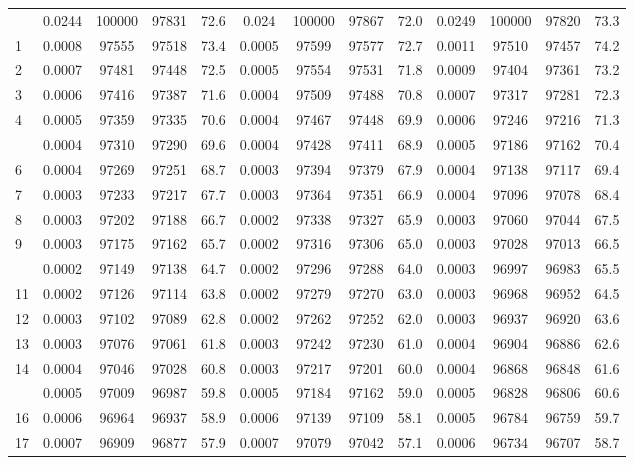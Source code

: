 \documentclass[
  14pt,
]{article}
\begin{document}
\begin{longtable}[t]{lcccccccccccc}
\endfoot
\bottomrule
\endlastfoot
0 & 0.0244 & 100000 & 97831 & 72.6 & 0.024 & 100000 & 97867 & 72.0 & 0.0249 & 100000 & 97820 & 73.3\\
1 & 0.0008 & 97555 & 97518 & 73.4 & 0.0005 & 97599 & 97577 & 72.7 & 0.0011 & 97510 & 97457 & 74.2\\
2 & 0.0007 & 97481 & 97448 & 72.5 & 0.0005 & 97554 & 97531 & 71.8 & 0.0009 & 97404 & 97361 & 73.2\\
3 & 0.0006 & 97416 & 97387 & 71.6 & 0.0004 & 97509 & 97488 & 70.8 & 0.0007 & 97317 & 97281 & 72.3\\
4 & 0.0005 & 97359 & 97335 & 70.6 & 0.0004 & 97467 & 97448 & 69.9 & 0.0006 & 97246 & 97216 & 71.3\\
\addlinespace
5 & 0.0004 & 97310 & 97290 & 69.6 & 0.0004 & 97428 & 97411 & 68.9 & 0.0005 & 97186 & 97162 & 70.4\\
6 & 0.0004 & 97269 & 97251 & 68.7 & 0.0003 & 97394 & 97379 & 67.9 & 0.0004 & 97138 & 97117 & 69.4\\
7 & 0.0003 & 97233 & 97217 & 67.7 & 0.0003 & 97364 & 97351 & 66.9 & 0.0004 & 97096 & 97078 & 68.4\\
8 & 0.0003 & 97202 & 97188 & 66.7 & 0.0002 & 97338 & 97327 & 65.9 & 0.0003 & 97060 & 97044 & 67.5\\
9 & 0.0003 & 97175 & 97162 & 65.7 & 0.0002 & 97316 & 97306 & 65.0 & 0.0003 & 97028 & 97013 & 66.5\\
\addlinespace
10 & 0.0002 & 97149 & 97138 & 64.7 & 0.0002 & 97296 & 97288 & 64.0 & 0.0003 & 96997 & 96983 & 65.5\\
11 & 0.0002 & 97126 & 97114 & 63.8 & 0.0002 & 97279 & 97270 & 63.0 & 0.0003 & 96968 & 96952 & 64.5\\
12 & 0.0003 & 97102 & 97089 & 62.8 & 0.0002 & 97262 & 97252 & 62.0 & 0.0003 & 96937 & 96920 & 63.6\\
13 & 0.0003 & 97076 & 97061 & 61.8 & 0.0003 & 97242 & 97230 & 61.0 & 0.0004 & 96904 & 96886 & 62.6\\
14 & 0.0004 & 97046 & 97028 & 60.8 & 0.0003 & 97217 & 97201 & 60.0 & 0.0004 & 96868 & 96848 & 61.6\\
\addlinespace
15 & 0.0005 & 97009 & 96987 & 59.8 & 0.0005 & 97184 & 97162 & 59.0 & 0.0005 & 96828 & 96806 & 60.6\\
16 & 0.0006 & 96964 & 96937 & 58.9 & 0.0006 & 97139 & 97109 & 58.1 & 0.0005 & 96784 & 96759 & 59.7\\
17 & 0.0007 & 96909 & 96877 & 57.9 & 0.0007 & 97079 & 97042 & 57.1 & 0.0006 & 96734 & 96707 & 58.7\\

\end{longtable}
\end{document}
